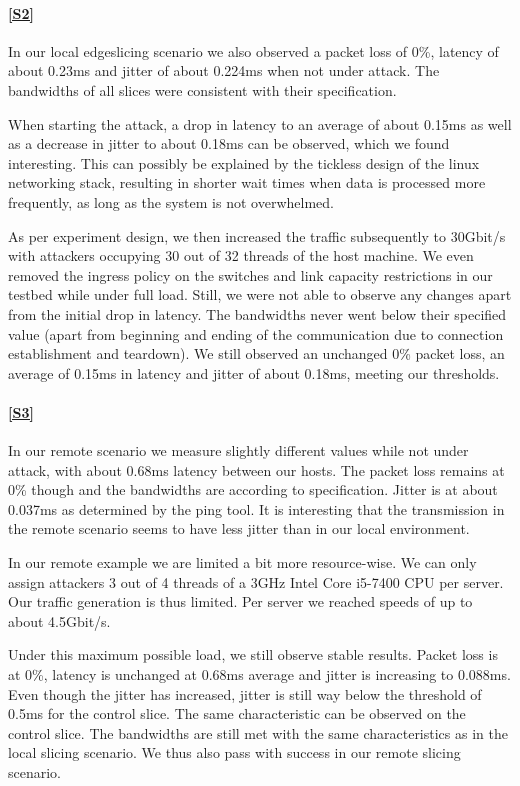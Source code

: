 \begin{description}[style=multiline, labelwidth=0.7cm]
    \paragraph{\ref{S2}} In our local edgeslicing scenario we also observed a packet loss of 0\%, latency of about 0.23ms  and jitter of about 0.224ms when not under attack. The bandwidths of all slices were consistent with their specification.

    When starting the attack, a drop in latency to an average of about 0.15ms as well as a decrease in jitter to about 0.18ms can be observed, which we found interesting. This can possibly be explained by the tickless design of the linux networking stack, resulting in shorter wait times when data is processed more frequently, as long as the system is not overwhelmed.

    As per experiment design, we then increased the traffic subsequently to 30Gbit/s with attackers occupying 30 out of 32 threads of the host machine. We even removed the ingress policy on the switches and link capacity restrictions in our testbed while under full load. Still, we were not able to observe any changes apart from the initial drop in latency.
    The bandwidths never went below their specified value (apart from beginning and ending of the communication due to connection establishment and teardown). We still observed an unchanged 0\% packet loss, an average of 0.15ms in latency and jitter of about 0.18ms, meeting our thresholds.

    \paragraph{\ref{S3}} In our remote scenario we measure slightly different values while not under attack, with about 0.68ms latency between our hosts. The packet loss remains at 0\% though and the bandwidths are according to specification. Jitter is at about 0.037ms as determined by the ping tool. It is interesting that the transmission in the remote scenario seems to have less jitter than in our local environment.

    In our remote example we are limited a bit more resource-wise. We can only assign attackers 3 out of 4 threads of a 3GHz Intel Core i5-7400 CPU per server. Our traffic generation is thus limited. Per server we reached speeds of up to about 4.5Gbit/s.

    Under this maximum possible load, we still observe stable results. Packet loss is at 0\%, latency is unchanged at 0.68ms average and jitter is increasing to 0.088ms. Even though the jitter has increased, jitter is still way below the threshold of 0.5ms for the control slice. The same characteristic can be observed on the control slice. The bandwidths are still met with the same characteristics as in the local slicing scenario. We thus also pass with success in our remote slicing scenario.


\end{description}
